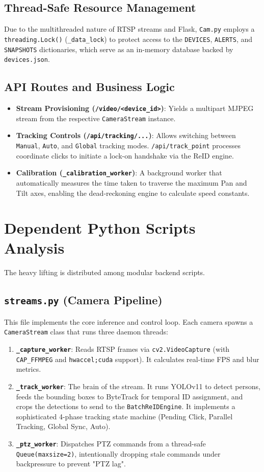 \documentclass[12pt,a4paper]{article}
\begin{document}
\subsection{Thread-Safe Resource Management}
Due to the multithreaded nature of RTSP streams and Flask, \texttt{Cam.py} employs a \texttt{threading.Lock()} (\texttt{\_data\_lock}) to protect access to the \texttt{DEVICES}, \texttt{ALERTS}, and \texttt{SNAPSHOTS} dictionaries, which serve as an in-memory database backed by \texttt{devices.json}.

\subsection{API Routes and Business Logic}
\begin{itemize}
    \item \textbf{Stream Provisioning (\texttt{/video/<device\_id>})}: Yields a multipart MJPEG stream from the respective \texttt{CameraStream} instance.
    \item \textbf{Tracking Controls (\texttt{/api/tracking/...})}: Allows switching between \texttt{Manual}, \texttt{Auto}, and \texttt{Global} tracking modes. \texttt{/api/track\_point} processes coordinate clicks to initiate a lock-on handshake via the ReID engine.
    \item \textbf{Calibration (\texttt{\_calibration\_worker})}: A background worker that automatically measures the time taken to traverse the maximum Pan and Tilt axes, enabling the dead-reckoning engine to calculate speed constants.
\end{itemize}

\section{Dependent Python Scripts Analysis}
The heavy lifting is distributed among modular backend scripts.

\subsection{\texttt{streams.py} (Camera Pipeline)}
This file implements the core inference and control loop. Each camera spawns a \texttt{CameraStream} class that runs three daemon threads:
\begin{enumerate}
    \item \textbf{\texttt{\_capture\_worker}}: Reads RTSP frames via \texttt{cv2.VideoCapture} (with \texttt{CAP\_FFMPEG} and \texttt{hwaccel;cuda} support). It calculates real-time FPS and blur metrics.
    \item \textbf{\texttt{\_track\_worker}}: The brain of the stream. It runs YOLOv11 to detect persons, feeds the bounding boxes to ByteTrack for temporal ID assignment, and crops the detections to send to the \texttt{BatchReIDEngine}. It implements a sophisticated 4-phase tracking state machine (Pending Click, Parallel Tracking, Global Sync, Auto).
    \item \textbf{\texttt{\_ptz\_worker}}: Dispatches PTZ commands from a thread-safe \texttt{Queue(maxsize=2)}, intentionally dropping stale commands under backpressure to prevent "PTZ lag".
\end{enumerate}
\end{document}
